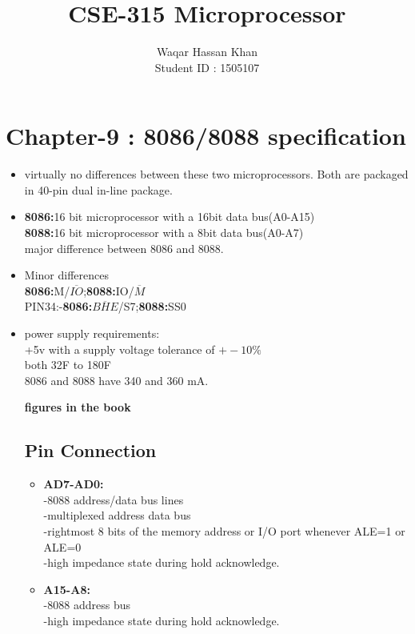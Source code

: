 \documentclass[12pt]{article}
\title{	
	\textbf{CSE-315 Microprocessor}
	\endgraf\bigskip
}
\author{
	\Large{Waqar Hassan Khan}\\
	\Large{Student ID : 1505107}
}
\date{}
\begin{document}
\maketitle

\section{Chapter-9 : 8086/8088 specification}

\begin{itemize}
	\item virtually no differences between these two microprocessors. Both are packaged in 40-pin dual in-line package.
	
	\item\textbf{8086:}16 bit microprocessor with a 16bit data bus(A0-A15)\\
	\textbf{8088:}16 bit microprocessor with a 8bit data bus(A0-A7)\\
	major difference between 8086 and 8088.
	
	\item Minor differences\\
	\textbf{8086:}M/$\overline{IO}$;\textbf{8088:}IO/$\overline{M}$\\
	PIN34:-\textbf{8086:}$\overline{BHE}$/S7;\textbf{8088:}SS0\\
	
	\item power supply requirements:\\
	+5v with a supply voltage tolerance of $+-10\%$\\
	both 32F to 180F\\
	8086 and 8088 have 340 and 360 mA.
	
	\textbf{figures in the book}
	
	\subsection{Pin Connection}
	\begin{itemize}
		\item \textbf{AD7-AD0:}\\
		-8088 address/data bus lines\\
		-multiplexed address data bus\\
		-rightmost 8 bits of the memory address or I/O port whenever ALE=1 or ALE=0\\
		-high impedance state during hold acknowledge.\\
		
		\item \textbf{A15-A8:} \\
		-8088 address bus\\
		-high impedance state during hold acknowledge.\\
		

\end{itemize}
\end{itemize}
\end{document}
